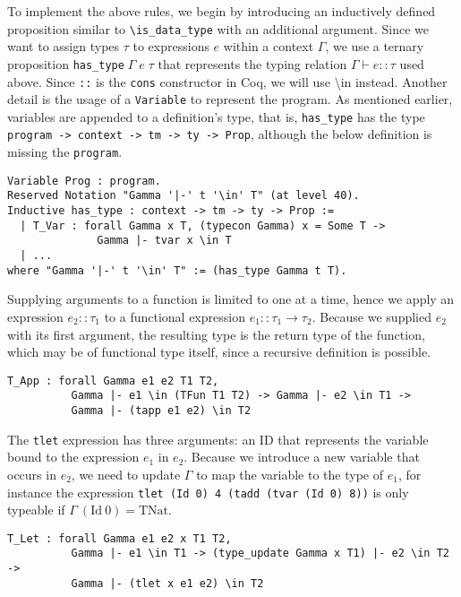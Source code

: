\documentclass[fleqn]{scrreprt}
\newcommand{\todo}[1]{\marginpar{\textbf{TODO:} #1}}
\newcommand{\coqinline}[1]{\texttt{#1}}
\begin{document}
\par \todo{Redundanzen entfernen}
To implement the above rules, we begin by introducing an inductively defined proposition similar to \texttt{\textbackslash is\_data\_type} with an additional argument. Since we want to assign types $\tau$ to expressions $e$ within a context $\Gamma$, we use a ternary proposition \coqinline{has_type}$\; \Gamma \; e \; \tau$ that represents the typing relation $\Gamma \vdash e :: \tau$ used above. Since \coqinline{::} is the \coqinline{cons} constructor in Coq, we will use \textbackslash in instead. Another detail is the usage of a \coqinline{Variable} to represent the program. As mentioned earlier, variables are appended to a definition's type, that is, \coqinline{has_type} has the type \coqinline{program -> context -> tm -> ty -> Prop}, although the below definition is missing the \coqinline{program}.
\begin{verbatim}
Variable Prog : program.
Reserved Notation "Gamma '|-' t '\in' T" (at level 40).
Inductive has_type : context -> tm -> ty -> Prop :=
  | T_Var : forall Gamma x T, (typecon Gamma) x = Some T ->
              Gamma |- tvar x \in T
  | ...
where "Gamma '|-' t '\in' T" := (has_type Gamma t T).
\end{verbatim}
Supplying arguments to a function is limited to one at a time, hence we apply an expression $e_{2} :: \tau_{1}$ to a functional expression $e_{1} :: \tau_{1} \rightarrow \tau_{2}$. Because we supplied $e_{2}$ with its first argument, the resulting type is the return type of the function, which may be of functional type itself, since a recursive definition is possible.
\begin{verbatim}
T_App : forall Gamma e1 e2 T1 T2,
          Gamma |- e1 \in (TFun T1 T2) -> Gamma |- e2 \in T1 ->
          Gamma |- (tapp e1 e2) \in T2
\end{verbatim}
The \coqinline{tlet} expression has three arguments: an ID that represents the variable bound to the expression $e_{1}$ in $e_{2}$. Because we introduce a new variable that occurs in $e_{2}$, we need to update $\Gamma$ to map the variable to the type of $e_{1}$, for instance the expression \coqinline{tlet (Id 0) 4 (tadd (tvar (Id 0) 8))} is only typeable if $\Gamma \:(\text{Id}\: 0) = \text{TNat}$.
\begin{verbatim}
T_Let : forall Gamma e1 e2 x T1 T2,
          Gamma |- e1 \in T1 -> (type_update Gamma x T1) |- e2 \in T2 ->
          Gamma |- (tlet x e1 e2) \in T2
\end{verbatim}
\end{document}
